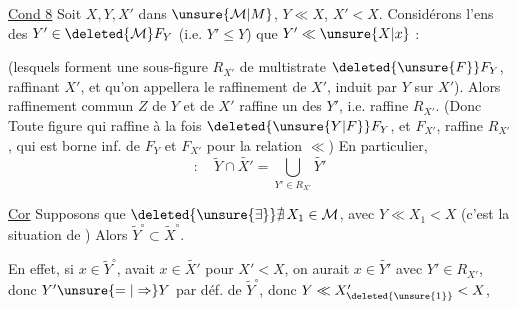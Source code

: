 \uline{Cond 8} Soit $X,Y,X'$ dans $\unsure{\mathcal M|M}$, $Y\ll X$, $X'<X$. Considérons l'ens des $Y'\in\deleted{\mathcal M}F_Y$ (i.e. $Y'\leq Y$)  que $Y'\ll\unsure{X|x}$ :

(lesquels forment une sous-figure $R_{X'}$ de  multistrate $\deleted{\unsure{F}}F_Y$,  raffinant $X'$, et qu'on appellera le raffinement de $X'$, induit par $Y$ sur $X'$). Alors  raffinement commun $Z$ de $Y$ et de $X'$ raffine un des $Y'$, i.e. raffine $R_{X'}$. (Donc Toute figure qui raffine à la fois $\deleted{\unsure{Y|F}}F_Y$, et $F_{X'}$, raffine $R_{X'}$, qui est  borne inf. de $F_Y$ et $F_{X'}$ pour la relation $\ll$) En particulier,
\[
 :\quad \widetilde Y\cap\widetilde{X'}=\bigcup_{Y'\in R_{X'}}\widetilde{Y'}
\]

\uline{Cor}  Supposons que $\deleted{\unsure{\exists}}\nexists\,X_1\in\mathcal M$, avec $Y\ll X_1<X$ (c'est la situation de ) Alors $\widetilde Y^\circ\subset\widetilde X^\circ$.

En effet, si $x\in\widetilde Y^\circ$,  avait $x\in\widetilde{X'}$ pour $X'<X$, on aurait $x\in\widetilde{Y'}$ avec $Y'\in R_{X'}$, donc $Y'\unsure{=|\Rightarrow}Y$ par déf. de $\widetilde Y^\circ$, donc $Y\ll X'_{\deleted{\unsure{1}}}<X$, 
